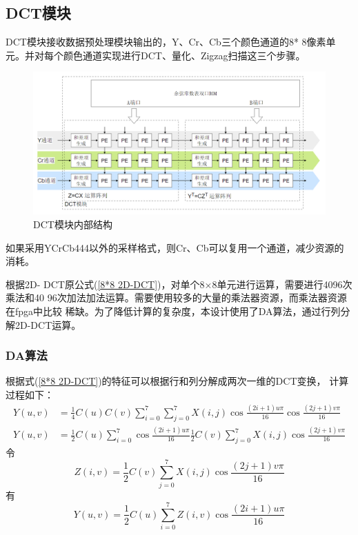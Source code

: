 \documentclass{article}
\numberwithin {equation}{section}
\begin{document}
\begin{spacing}{1.25}
  \subsection{DCT模块}
    \vspace{1em}
    DCT模块接收数据预处理模块输出的，Y、Cr、Cb三个颜色通道的8*
    8像素单元。并对每个颜色通道实现进行DCT、量化、Zigzag扫描这三个步骤。
    \begin{figure}[H]
      \centering
      \includegraphics[scale=0.5]{./pictures/dct.png}
      \caption{DCT模块内部结构}
      \label{code module}
    \end{figure}

    如果采用YCrCb444以外的采样格式，则Cr、Cb可以复用一个通道，减少资源的消耗。
    
    根据2D-
    DCT原公式(\ref{8*8 2D-DCT})，对单个8×8单元进行运算，需要进行4096次乘法和40
    96次加法加法运算。需要使用较多的大量的乘法器资源，而乘法器资源在fpga中比较
    稀缺。为了降低计算的复杂度，本设计使用了DA算法\cite{chen1977fast}，通过行列分解2D-DCT运算。
      \subsubsection{DA算法}
        \vspace{1em}
        根据式(\ref{8*8 2D-DCT})的特征可以根据行和列分解成两次一维的DCT变换，
        计算过程如下：
        \begin{equation*}
          \begin{aligned}
            Y(u,v)&=\frac{1}{4}C(u)C(v)\sum_{i=0}^{7}\sum_{j=0}^{7}X(i,j)
            \cos\frac{(2i+1)u\pi}{16}\cos\frac{(2j+1)v\pi}{16}\\
            Y(u,v)&=\frac{1}{2}C(u)\sum_{i=0}^{7}\cos\frac{(2i+1)u\pi}{16}
            \frac{1}{2}C(v)\sum_{j=0}^{7}X(i,j)\cos\frac{(2j+1)v\pi}{16}
          \end{aligned}
        \end{equation*}
        令
        \begin{equation}
          Z(i,v)=\frac{1}{2}C(v)\sum_{j=0}^{7}X(i,j)\cos\frac{(2j+1)v\pi}{16}
          \label{colDCT}
        \end{equation}
        有
        \begin{equation} 
          Y(u,v)=\frac{1}{2}C(u)\sum_{i=0}^{7}
          Z(i,v)\cos\frac{(2i+1)u\pi}{16}
          \label{rowDCT}
        \end{equation}


\end{spacing}
\end{document}

